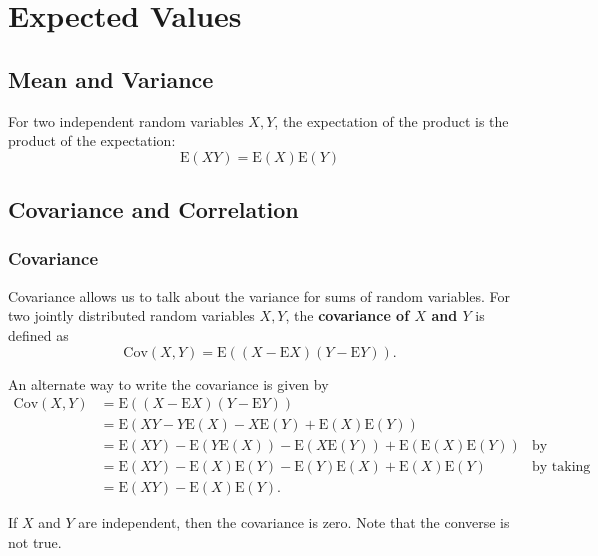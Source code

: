 \documentclass[a4paper,10pt]{article}
\newcommand{\E}{\mathrm{E}}
\newcommand{\Cov}{\mathrm{Cov}}
\begin{document}
\newpage
\section{Expected Values}

\subsection{Mean and Variance}
For two independent random variables $X, Y$, the expectation of the product is the product of the expectation:
\begin{equation*}
    \E(XY) = \E(X)\E(Y)
\end{equation*}

\subsection{Covariance and Correlation}

\subsubsection{Covariance}

Covariance allows us to talk about the variance for sums of random variables. For two jointly distributed random variables $X, Y$, the \textbf{covariance of $X$ and $Y$} is defined as 
\begin{equation*}
    \Cov (X, Y) = \E((X - \E X)(Y - \E Y)).
\end{equation*}

An alternate way to write the covariance is given by 
\begin{align*}
    \Cov (X, Y) &= \E((X - \E X)(Y - \E Y)) \\
                &= \E(XY - Y\E(X) - X\E(Y) + \E(X)\E(Y)) \\
                &= \E(XY) - \E(Y\E(X)) - \E(X \E(Y)) + \E(\E(X) \E(Y)) &\text{by linearity of expectation} \\
                &= \E(XY) - \E(X)\E(Y) - \E(Y)\E(X) + \E(X)\E(Y) &\text{by taking out constants} \\
                &= \E(XY) - \E(X)\E(Y).
\end{align*}

If $X$ and $Y$ are independent, then the covariance is zero. Note that the converse is not true. 
\end{document}
